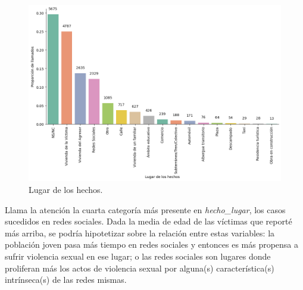 \documentclass[10 pt]{article}
\begin{document}
\begin{figure}[H]
    \begin{center}
    \includegraphics[scale=.5]{images/latex_lugar_hechos.png}
    \caption{Lugar de los hechos.}
    \label{hecholugar}
    \end{center}
    \end{figure}


Llama la atención la cuarta categoría más presente en \textit{hecho\_lugar}, los casos sucedidos en redes sociales. Dada la media de edad de las víctimas que reporté más arriba, se podría hipotetizar sobre la relación entre estas variables: la población joven pasa más tiempo en redes sociales y entonces es más propensa a sufrir violencia sexual en ese lugar; o las redes sociales son lugares donde proliferan más los actos de violencia sexual por alguna(s) característica(s) intrínseca(s) de las redes mismas. 

\end{document}
